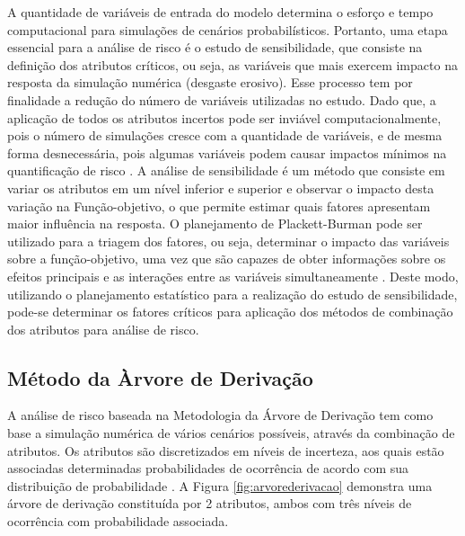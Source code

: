A quantidade de variáveis de entrada do modelo determina o esforço e tempo computacional para simulações de cenários probabilísticos. Portanto, uma etapa essencial para a análise de risco é o estudo de sensibilidade, que consiste na definição dos atributos críticos, ou seja, as variáveis que mais exercem impacto na resposta da simulação numérica (desgaste erosivo). Esse processo tem por finalidade a redução do número de variáveis utilizadas no estudo. Dado que, a aplicação de todos os atributos incertos pode ser inviável computacionalmente, pois o número de simulações cresce com a quantidade de variáveis, e de mesma forma desnecessária, pois algumas variáveis podem causar impactos mínimos na quantificação de risco \cite{santoss2}. A análise de sensibilidade é um método que consiste em variar os atributos em um nível inferior e superior e observar o impacto desta variação na Função-objetivo, o que permite estimar quais fatores apresentam maior influência na resposta. O planejamento de Plackett-Burman pode ser utilizado para a triagem dos fatores, ou seja, determinar o impacto das variáveis sobre a função-objetivo, uma vez que são capazes de obter informações sobre os efeitos  principais e as interações entre as variáveis simultaneamente \cite{plackett}. Deste modo, utilizando o planejamento estatístico para a realização do estudo de sensibilidade, pode-se determinar os fatores críticos para aplicação dos métodos de combinação dos atributos para análise de risco.


\subsection{Método da Àrvore de Derivação}

A análise de risco baseada na Metodologia da Árvore de Derivação tem como base a simulação numérica de vários cenários possíveis, através da combinação de atributos. Os atributos são discretizados em níveis de incerteza, aos quais estão associadas determinadas probabilidades de ocorrência de acordo com sua distribuição de probabilidade \cite{madeira}. A Figura \ref{fig:arvorederivacao} demonstra uma árvore de derivação constituída por 2 atributos, ambos com três níveis de ocorrência com probabilidade associada.


